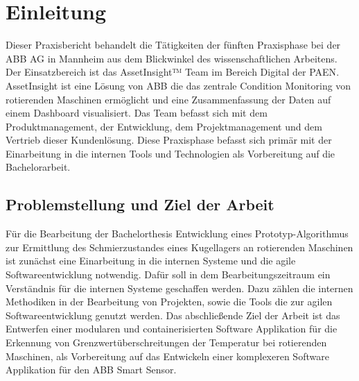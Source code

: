 \chapter{Einleitung}
Dieser Praxisbericht behandelt die Tätigkeiten der fünften Praxisphase bei der \ac{ABB} AG in Mannheim aus dem Blickwinkel des wissenschaftlichen Arbeitens. 
Der Einsatzbereich ist das AssetInsight™ Team im Bereich Digital der \ac{PAEN}. AssetInsight ist eine Lösung von \ac{ABB} die das zentrale Condition Monitoring
von rotierenden Maschinen ermöglicht und eine Zusammenfassung der Daten auf einem Dashboard visualisiert. Das Team befasst sich mit dem Produktmanagement, der Entwicklung,
dem Projektmanagement und dem Vertrieb dieser Kundenlösung. Diese Praxisphase befasst sich primär mit der Einarbeitung in die internen Tools und Technologien
als Vorbereitung auf die Bachelorarbeit.


\section{Problemstellung und Ziel der Arbeit}
Für die Bearbeitung der Bachelorthesis \glqq Entwicklung eines Prototyp-Algorithmus zur Ermittlung des Schmierzustandes eines Kugellagers an rotierenden Maschinen\grqq{} ist 
zunächst eine Einarbeitung in die internen Systeme und die agile Softwareentwicklung notwendig. 
Dafür soll in dem Bearbeitungszeitraum ein Verständnis für die internen Systeme geschaffen werden. Dazu zählen die internen Methodiken in der Bearbeitung von Projekten, sowie die Tools die
zur agilen Softwareentwicklung genutzt werden.
Das abschließende Ziel der Arbeit ist das Entwerfen einer modularen und containerisierten Software Applikation für die Erkennung von Grenzwertüberschreitungen der Temperatur bei 
rotierenden Maschinen, als Vorbereitung auf das Entwickeln einer komplexeren Software Applikation für den ABB Smart Sensor. 

